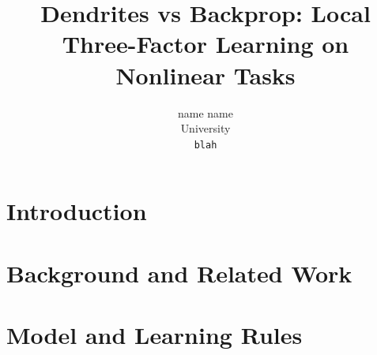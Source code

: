 \documentclass{article}
\title{Dendrites vs Backprop: Local Three-Factor Learning on Nonlinear Tasks}
\author{
  name name \\
    University \\
  \texttt{blah}
}
\begin{document}
\maketitle

\begin{abstract}
\end{abstract}

\section{Introduction}

\section{Background and Related Work}

\section{Model and Learning Rules}

\end{document}
